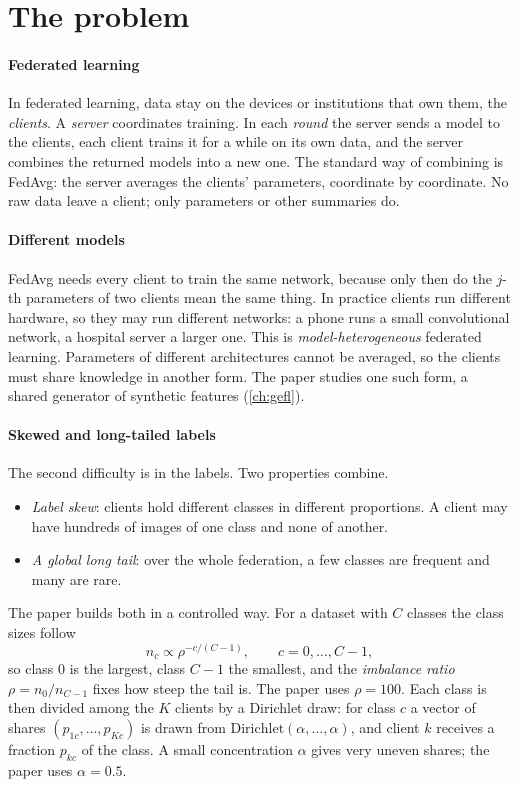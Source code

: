 \section{The problem}\label{ch:problem}

\paragraph{Federated learning} In federated learning, data stay on the devices or institutions that own them, the
\emph{clients}. A \emph{server} coordinates training. In each \emph{round} the server sends a model to the clients,
each client trains it for a while on its own data, and the server combines the returned models into a new one. The
standard way of combining is FedAvg: the server averages the clients' parameters, coordinate by coordinate. No raw
data leave a client; only parameters or other summaries do.

\paragraph{Different models} FedAvg needs every client to train the same network, because only then do the $j$-th
parameters of two clients mean the same thing. In practice clients run different hardware, so they may run different
networks: a phone runs a small convolutional network, a hospital server a larger one. This is
\emph{model-heterogeneous} federated learning. Parameters of different architectures cannot be averaged, so the
clients must share knowledge in another form. The paper studies one such form, a shared generator of synthetic
features (\cref{ch:gefl}).

\paragraph{Skewed and long-tailed labels} The second difficulty is in the labels. Two properties combine.
\begin{itemize}
\item \emph{Label skew}: clients hold different classes in different proportions. A client may have hundreds of images
of one class and none of another.
\item \emph{A global long tail}: over the whole federation, a few classes are frequent and many are rare.
\end{itemize}
The paper builds both in a controlled way. For a dataset with $C$ classes the class sizes follow
\[
n_c\propto\rho^{-c/(C-1)},\qquad c=0,\dots,C-1,
\]
so class $0$ is the largest, class $C-1$ the smallest, and the \emph{imbalance ratio} $\rho=n_0/n_{C-1}$ fixes how
steep the tail is. The paper uses $\rho=100$. Each class is then divided among the $K$ clients by a Dirichlet draw: for
class $c$ a vector of shares $(p_{1c},\dots,p_{Kc})$ is drawn from $\mathrm{Dirichlet}(\alpha,\dots,\alpha)$, and client
$k$ receives a fraction $p_{kc}$ of the class. A small concentration $\alpha$ gives very uneven shares; the paper uses
$\alpha=0.5$.

